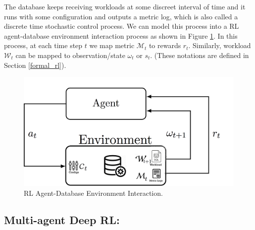 The database keeps receiving workloads at some discreet interval of time and it runs with some configuration and outputs a metric log, which is also called a discrete time stochastic control process.
We can model this process into a RL agent-database environment interaction process as shown in Figure \ref{fig:database_agent}.
In this process, at each time step $t$ we map metric $\mathcal{M}_t$ to rewards $r_t$. Similarly, workload $\mathcal{W}_t$ can be mapped to observation/state $\omega_t$ or $s_t$. (These notations are defined in Section \ref{formal_rl}).



\begin{figure}[t]
	\includegraphics[width=0.9\linewidth ]{fig/database_agent.png}
    \vspace{-2mm}
    \caption{RL Agent-Database Environment Interaction.}
    \label{fig:database_agent}
\end{figure}


\subsection*{Multi-agent Deep RL:}







